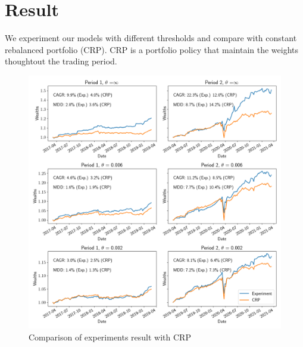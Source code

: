 \section{Result}

We experiment our models with different thresholds and compare with constant rebalanced portfolio (CRP). 
CRP is a portfolio policy that maintain the weights thoughtout the trading period. 

\begin{figure}[ht]
  \includegraphics[width=15cm]{images/crp_compare.png}
  \caption [Comparison of experiments result with CRP]{Comparison of experiments result with CRP}
  \label{fig:crp_compare}
\end{figure}
